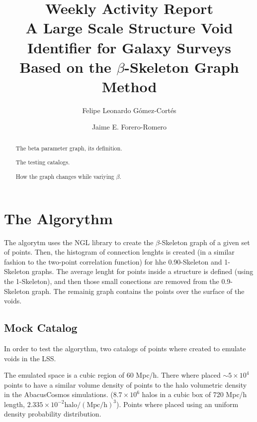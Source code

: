 \documentclass[preprint]{aastex62}
\begin{document}
\title{Weekly Activity Report\\A Large Scale Structure Void Identifier for Galaxy Surveys
  Based on the $\beta$-Skeleton Graph Method}


\author{Felipe Leonardo Gómez-Cortés}

\nocollaboration

\author{Jaime E. Forero-Romero}


\begin{abstract}
  The beta parameter graph, its definition.

  The testing catalogs.

  How the graph changes while variying $\beta$.

  
  

\end{abstract}

\newpage

\section{The Algorythm}

The algorytm uses the NGL library %
to create the $\beta$-Skeleton graph of a given set of points.
Then, the histogram of connection lenghts is created
(in a similar fashion to the two-point correlation function)
for hhe 0.90-Skeleton and 1-Skeleton graphs.
The average lenght for points inside a structure is defined
(using the 1-Skeleton), and then those small conections are
removed from the 0.9-Skeleton graph. The remainig graph
contains the points over the surface of the voids.



\subsection{Mock Catalog}
In order to test the algorythm, two catalogs of points where
created to emulate voids in the LSS.

The emulated space is a cubic region of 60 Mpc/h.
There where placed $\sim 5 \times10^4$ points to have a similar
volume density of points to the halo volumetric density in
the AbacusCosmos simulations. ($8.7\times10^6$ halos in a cubic
box of 720 Mpc/h length,
$2.335\times10^{-2}\mathrm{halo/(Mpc/h)^3}$).
Points where placed using an uniform density probability distribution.
\end{document}
